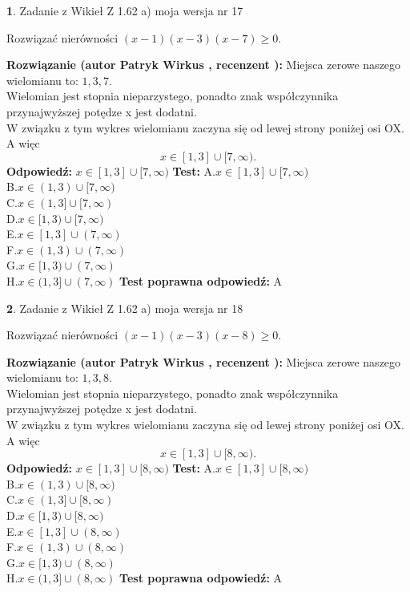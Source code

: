 \documentclass[12pt, a4paper]{article}
\theoremstyle{definition} %
\newtheorem{zad}{}
\newcommand{\zadStart}[1]{\begin{zad}#1\newline}
\newcommand{\zadStop}{\end{zad}}
\newcommand{\rozwStart}[2]{\noindent \textbf{Rozwiązanie (autor #1 , recenzent #2): }\newline}
\newcommand{\rozwStop}{\newline}
\newcommand{\odpStart}{\noindent \textbf{Odpowiedź:}\newline}
\newcommand{\odpStop}{\newline}
\newcommand{\testStart}{\noindent \textbf{Test:}\newline}
\newcommand{\testStop}{\newline}
\newcommand{\kluczStart}{\noindent \textbf{Test poprawna odpowiedź:}\newline}
\newcommand{\kluczStop}{\newline}
\begin{document}
\zadStart{Zadanie z Wikieł Z 1.62 a) moja wersja nr 17}

Rozwiązać nierówności $(x-1)(x-3)(x-7)\ge0$.
\zadStop
\rozwStart{Patryk Wirkus}{}
Miejsca zerowe naszego wielomianu to: $1, 3, 7$.\\
Wielomian jest stopnia nieparzystego, ponadto znak współczynnika przy\linebreak najwyższej potędze x jest dodatni.\\ W związku z tym wykres wielomianu zaczyna się od lewej strony poniżej osi OX. A więc $$x \in [1,3] \cup [7,\infty).$$
\rozwStop
\odpStart
$x \in [1,3] \cup [7,\infty)$
\odpStop
\testStart
A.$x \in [1,3] \cup [7,\infty)$\\
B.$x \in (1,3) \cup [7,\infty)$\\
C.$x \in (1,3] \cup [7,\infty)$\\
D.$x \in [1,3) \cup [7,\infty)$\\
E.$x \in [1,3] \cup (7,\infty)$\\
F.$x \in (1,3) \cup (7,\infty)$\\
G.$x \in [1,3) \cup (7,\infty)$\\
H.$x \in (1,3] \cup (7,\infty)$
\testStop
\kluczStart
A
\kluczStop



\zadStart{Zadanie z Wikieł Z 1.62 a) moja wersja nr 18}

Rozwiązać nierówności $(x-1)(x-3)(x-8)\ge0$.
\zadStop
\rozwStart{Patryk Wirkus}{}
Miejsca zerowe naszego wielomianu to: $1, 3, 8$.\\
Wielomian jest stopnia nieparzystego, ponadto znak współczynnika przy\linebreak najwyższej potędze x jest dodatni.\\ W związku z tym wykres wielomianu zaczyna się od lewej strony poniżej osi OX. A więc $$x \in [1,3] \cup [8,\infty).$$
\rozwStop
\odpStart
$x \in [1,3] \cup [8,\infty)$
\odpStop
\testStart
A.$x \in [1,3] \cup [8,\infty)$\\
B.$x \in (1,3) \cup [8,\infty)$\\
C.$x \in (1,3] \cup [8,\infty)$\\
D.$x \in [1,3) \cup [8,\infty)$\\
E.$x \in [1,3] \cup (8,\infty)$\\
F.$x \in (1,3) \cup (8,\infty)$\\
G.$x \in [1,3) \cup (8,\infty)$\\
H.$x \in (1,3] \cup (8,\infty)$
\testStop
\kluczStart
A
\kluczStop
\end{document}
